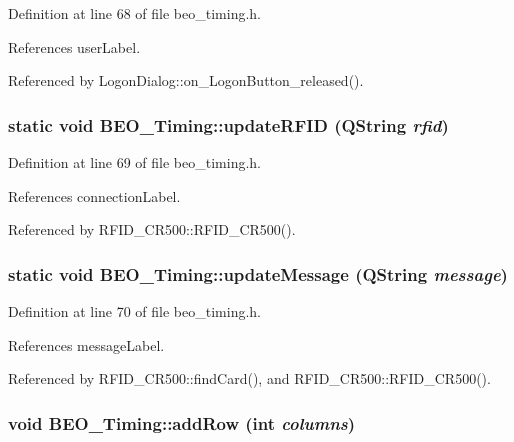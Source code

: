 Definition at line 68 of file beo\_\-timing.h.

References userLabel.

Referenced by LogonDialog::on\_\-LogonButton\_\-released().\hypertarget{class_b_e_o___timing_394c0e847c9a363fd1eb8c1e00404115}{
\subsubsection[updateRFID]{\setlength{\rightskip}{0pt plus 5cm}static void BEO\_\-Timing::updateRFID (QString {\em rfid})}}
\label{class_b_e_o___timing_394c0e847c9a363fd1eb8c1e00404115}




Definition at line 69 of file beo\_\-timing.h.

References connectionLabel.

Referenced by RFID\_\-CR500::RFID\_\-CR500().\hypertarget{class_b_e_o___timing_ab6e90f89fdd1a266ef14556a97c4212}{
\subsubsection[updateMessage]{\setlength{\rightskip}{0pt plus 5cm}static void BEO\_\-Timing::updateMessage (QString {\em message})}}
\label{class_b_e_o___timing_ab6e90f89fdd1a266ef14556a97c4212}




Definition at line 70 of file beo\_\-timing.h.

References messageLabel.

Referenced by RFID\_\-CR500::findCard(), and RFID\_\-CR500::RFID\_\-CR500().\hypertarget{class_b_e_o___timing_03a5745ceba3fd3d69f9a0ea722f7e51}{
\subsubsection[addRow]{\setlength{\rightskip}{0pt plus 5cm}void BEO\_\-Timing::addRow (int {\em columns})}}
\label{class_b_e_o___timing_03a5745ceba3fd3d69f9a0ea722f7e51}



